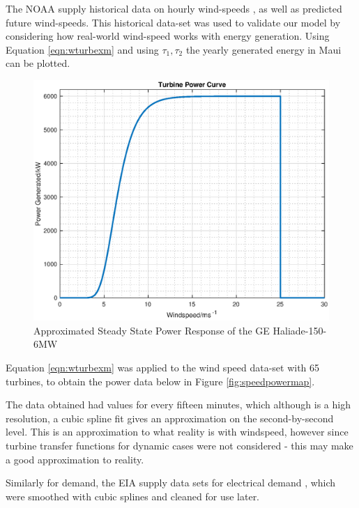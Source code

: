The NOAA supply historical data on hourly wind-speeds \cite{power:NOAA}, as well as predicted future wind-speeds.
This historical data-set was used to validate our model by considering how real-world wind-speed works with energy generation.
Using Equation \ref{eqn:wturbexm} and using $\tau_1, \tau_2$ the yearly generated energy in Maui can be plotted.
           \begin{figure}[bht]
                   \centering
                   \includegraphics[scale=0.4]{./images/turbine.eps}
                   \caption{Approximated Steady State Power Response of the GE Haliade-150-6MW} \label{fig:wturb}
           \end{figure}

Equation \ref{eqn:wturbexm} was applied to the wind speed data-set with 65 turbines, to obtain the power data below in Figure \ref{fig:speedpowermap}.

The data obtained had values for every fifteen minutes, which although is a high resolution, a cubic spline fit gives an approximation on the second-by-second level.
This is an approximation to what reality is with windspeed, however since turbine transfer functions for dynamic cases were not considered - this may make a good approximation to reality.

Similarly for demand, the EIA supply data sets for electrical demand \cite{power:EIA}, which were smoothed with cubic splines and cleaned for use later.

